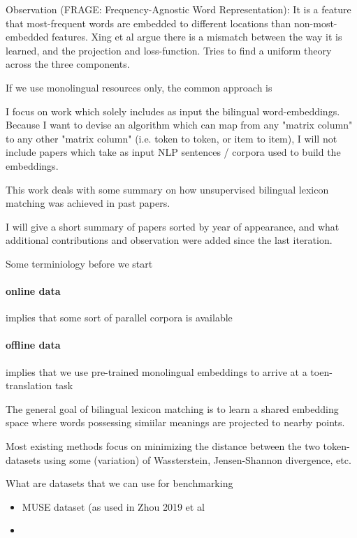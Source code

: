 \documentclass[a4paper,12pt,twoside,openright]{report}
\begin{document}
Observation (FRAGE: Frequency-Agnostic Word Representation): It is a feature that most-frequent words are embedded to different locations than non-most-embedded features.
Xing et al argue there is a mismatch between the way it is learned, and the projection and loss-function.
Tries to find a uniform theory across the three components.






If we use monolingual resources only, the common approach is

I focus on work which solely includes as input the bilingual word-embeddings.
Because I want to devise an algorithm which can map from any "matrix column" to any other "matrix column" (i.e. token to token, or item to item), I will not include papers which take as input NLP sentences / corpora used to build the embeddings. 

This work deals with some summary on how unsupervised bilingual lexicon matching was achieved in past papers.

I will give a short summary of papers sorted by year of appearance, and what additional contributions and observation were added since the last iteration.

Some terminiology before we start

\paragraph{online data} implies that some sort of parallel corpora is available
\paragraph{offline data} implies that we use pre-trained monolingual embeddings to arrive at a toen-translation task

The general goal of bilingual lexicon matching is to learn a shared embedding space where words possessing simiilar meanings are projected to nearby points.

Most existing methods focus on minimizing the distance between the two token-datasets using some (variation) of Wassterstein, Jensen-Shannon divergence, etc.

What are datasets that we can use for benchmarking

\begin{itemize}
\item MUSE dataset (as used in Zhou 2019 et al
\item 
\end{itemize}
\end{document}
